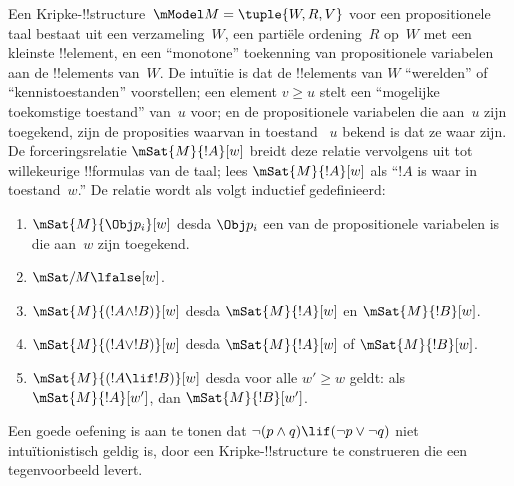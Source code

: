 \documentclass[../../../include/open-logic-section]{subfiles}
\begin{document}
Een Kripke-!!{structure}~$\mModel M = \tuple{W, R, V}$ voor een propositionele
taal bestaat uit een verzameling~$W$, een partiële ordening~$R$ op~$W$ met een
kleinste !!{element}, en een ``monotone'' toekenning van propositionele
variabelen aan de !!{element}s van~$W$. De intuïtie is dat de !!{element}s van
$W$ ``werelden'' of ``kennistoestanden'' voorstellen; een element $v \geq u$
stelt een ``mogelijke toekomstige toestand'' van~$u$ voor; en de propositionele
variabelen die aan~$u$ zijn toegekend, zijn de proposities waarvan in toestand
~$u$ bekend is dat ze waar zijn. De forceringsrelatie $\mSat{M}{!A}[w]$ breidt
deze relatie vervolgens uit tot willekeurige !!{formula}s van de taal; lees
$\mSat{M}{!A}[w]$ als ``$!A$ is waar in toestand~$w$.'' De relatie wordt als
volgt inductief gedefinieerd:
\begin{enumerate}
\item $\mSat{M}{\Obj p_i}[w]$ desda $\Obj p_i$ een van de propositionele
  variabelen is die aan~$w$ zijn toegekend.
\item $\mSat/{M}{\lfalse}[w]$.
\item $\mSat{M}{(!A \land !B)}[w]$ desda $\mSat{M}{!A}[w]$ en $\mSat{M}{!B}[w]$.
\item $\mSat{M}{(!A \lor !B)}[w]$ desda $\mSat{M}{!A}[w]$ of $\mSat{M}{!B}[w]$.
\item $\mSat{M}{(!A \lif !B)}[w]$ desda voor alle $w' \geq w$ geldt: als
  $\mSat{M}{!A}[w']$, dan $\mSat{M}{!B}[w']$.
\end{enumerate}
Een goede oefening is aan te tonen dat $\lnot (p \land q) \lif
(\lnot p \lor \lnot q)$ niet intuïtionistisch geldig is, door een
Kripke-!!{structure} te construeren die een tegenvoorbeeld levert.
\end{document}

